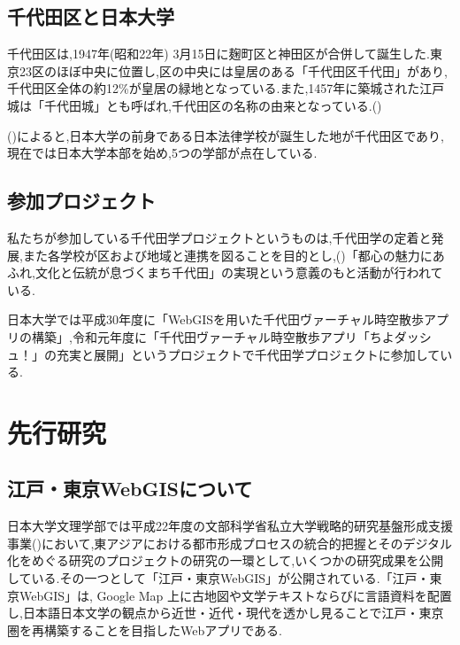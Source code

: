\documentclass[a4paper, twoside]{jarticle}
\begin{document}
\begin{multicols}{2}
\subsection{千代田区と日本大学}
千代田区は,1947年(昭和22年) 3月15日に麹町区と神田区が合併して誕生した.東京23区のほぼ中央に位置し,区の中央には皇居のある「千代田区千代田」があり,千代田区全体の約12\%が皇居の緑地となっている.また,1457年に築城された江戸城は「千代田城」とも呼ばれ,千代田区の名称の由来となっている.(\cite{digi1})\par
(\cite{digi2})によると,日本大学の前身である日本法律学校が誕生した地が千代田区であり,現在では日本大学本部を始め,5つの学部が点在している.

\subsection{参加プロジェクト}
私たちが参加している千代田学プロジェクトというものは,千代田学の定着と発展,また各学校が区および地域と連携を図ることを目的とし,(\cite{chiyopro})「都心の魅力にあふれ,文化と伝統が息づくまち千代田」の実現という意義のもと活動が行われている.\par
日本大学では平成30年度に「WebGISを用いた千代田ヴァーチャル時空散歩アプリの構築」,令和元年度に「千代田ヴァーチャル時空散歩アプリ「ちよダッシュ！」の充実と展開」というプロジェクトで千代田学プロジェクトに参加している.


\section{先行研究}


\subsection{江戸・東京WebGISについて}
日本大学文理学部では平成22年度の文部科学省私立大学戦略的研究基盤形成支援事業(\cite{monka})において,東アジアにおける都市形成プロセスの統合的把握とそのデジタル化をめぐる研究のプロジェクトの研究の一環として,いくつかの研究成果を公開している.その一つとして「江戸・東京WebGIS」が公開されている.「江戸・東京WebGIS」は, Google Map 上に古地図や文学テキストならびに言語資料を配置し,日本語日本文学の観点から近世・近代・現代を透かし見ることで江戸・東京圏を再構築することを目指したWebアプリである.


\end{multicols}
\end{document}
